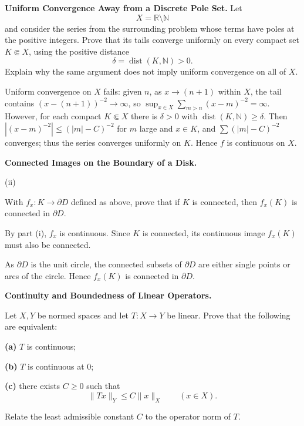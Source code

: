 \begin{problem}[CP-II-0479]
\label{prob:cp-ii-0479}
\textbf{Uniform Convergence Away from a Discrete Pole Set.}
Let
\[
X=\mathbb R\setminus\mathbb N
\]
and consider the series from the surrounding problem whose terms have poles at
the positive integers. Prove that its tails converge uniformly on every compact
set \(K\Subset X\), using the positive distance
\[
\delta=\operatorname{dist}(K,\mathbb N)>0.
\]
Explain why the same argument does not imply uniform convergence on all of \(X\).
\end{problem}

\begin{solution}
Uniform convergence on $X$ fails: given $n$, as $x\to(n+1)$ within $X$,
the tail contains $(x-(n+1))^{-2}\to\infty$, so $\sup_{x\in X}\sum_{m>n}(x-m)^{-2}=\infty$.
However, for each compact $K\Subset X$ there is $\delta>0$ with $\operatorname{dist}(K,\mathbb N)\ge\delta$.
Then $|(x-m)^{-2}|\le (|m|-C)^{-2}$ for $m$ large and $x\in K$, and $\sum (|m|-C)^{-2}$ converges; thus the series
converges uniformly on $K$. Hence $f$ is continuous on $X$.

\bigskip
\end{solution}

\begin{problem}[CP-II-0492]
\label{prob:cp-ii-0492}
\textbf{Connected Images on the Boundary of a Disk.}

\hspace*{1.5em}(ii)

With $f_x : K \to \partial D$ defined as above, prove that if $K$ is connected, then $f_x(K)$ is connected in $\partial D$.
\end{problem}

\begin{solution}
By part (i), $f_x$ is continuous. Since $K$ is connected, its continuous image $f_x(K)$ must also be connected.

As $\partial D$ is the unit circle, the connected subsets of $\partial D$ are either single points or arcs of the circle. Hence $f_x(K)$ is connected in $\partial D$.
\end{solution}

\begin{problem}[CP-II-0494]
\label{prob:cp-ii-0494}
\textbf{Continuity and Boundedness of Linear Operators.}

\hspace*{1.5em}Let \(X,Y\) be normed spaces and let \(T:X\to Y\) be linear. Prove that the
following are equivalent:

\par\smallskip\noindent\textbf{(a)}\quad
\(T\) is continuous;

\par\smallskip\noindent\textbf{(b)}\quad
\(T\) is continuous at \(0\);

\par\smallskip\noindent\textbf{(c)}\quad
there exists \(C\ge0\) such that
\[
\|Tx\|_Y\le C\|x\|_X
\qquad(x\in X).
\]

Relate the least admissible constant \(C\) to the operator norm of \(T\).
\end{problem}

